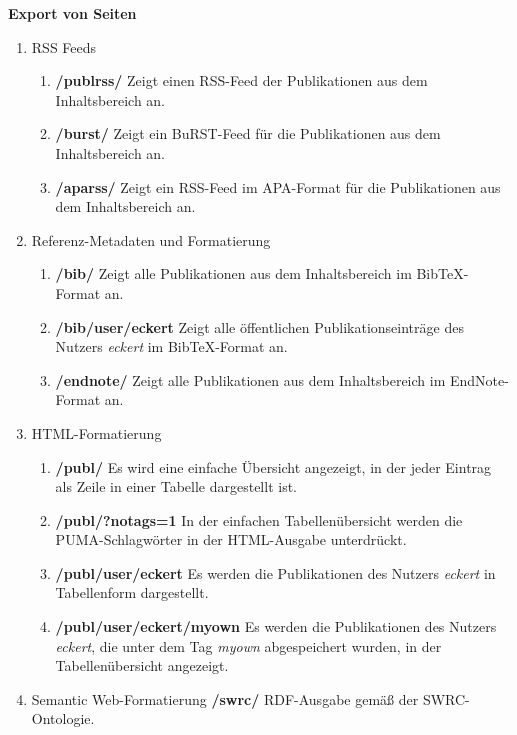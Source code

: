 \textbf{Export von Seiten}
\begin{enumerate}
    \item RSS Feeds
    \begin{enumerate}
        \item \textbf{/publrss/} \newline
        Zeigt einen RSS-Feed der Publikationen aus dem Inhaltsbereich an.
        \item \textbf{/burst/} \newline
        Zeigt ein BuRST-Feed für die Publikationen aus dem Inhaltsbereich an.
        \item \textbf{/aparss/} \newline
        Zeigt ein RSS-Feed im APA-Format für die Publikationen aus dem Inhaltsbereich an.
    \end{enumerate}
    \item Referenz-Metadaten und Formatierung
    \begin{enumerate}
        \item \textbf{/bib/} \newline
        Zeigt alle Publikationen aus dem Inhaltsbereich im BibTeX-Format an.
        \item \textbf{/bib/user/eckert} \newline
        Zeigt alle öffentlichen Publikationseinträge des Nutzers \textit{eckert} im BibTeX-Format an.
        \item \textbf{/endnote/} \newline
        Zeigt alle Publikationen aus dem Inhaltsbereich im EndNote-Format an.
    \end{enumerate}
    \item HTML-Formatierung
    \begin{enumerate}
        \item \textbf{ /publ/} \newline
        Es wird eine einfache Übersicht angezeigt, in der jeder Eintrag als Zeile in einer Tabelle dargestellt ist.
        \item \textbf{/publ/?notags=1} \newline
        In der einfachen Tabellenübersicht werden die PUMA-Schlagwörter in der HTML-Ausgabe unterdrückt.
        \item \textbf{/publ/user/eckert} \newline
        Es werden die Publikationen des Nutzers \textit{eckert} in Tabellenform dargestellt.
        \item \textbf{ /publ/user/eckert/myown} \newline
        Es werden die Publikationen des Nutzers \textit{eckert}, die unter dem Tag \textit{myown} abgespeichert wurden, in der Tabellenübersicht angezeigt. 
    \end{enumerate}
    \item Semantic Web-Formatierung
    \newline \newline \textbf{/swrc/} \newline
        RDF-Ausgabe gemäß der SWRC-Ontologie.
    
\end{enumerate}

